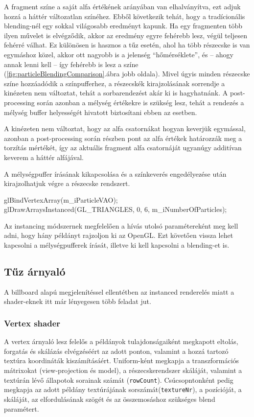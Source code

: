 A fragment színe a saját alfa értékének arányában van elhalványítva, ezt adjuk hozzá a háttér változatlan színéhez. Ebből következik tehát, hogy a tradícionális blending-nél egy sokkal világosabb eredményt kapunk. Ha egy fragmenten több ilyen művelet is elvégződik, akkor az eredmény egyre fehérebb lesz, végül teljesen fehérré válhat. Ez különösen is hasznos a tűz esetén, ahol ha több részecske is van egymáshoz közel, akkor ott nagyobb is a jelenség ``hőmérséklete'', és -- ahogy annak lenni kell -- így fehérebb is lesz a színe (\ref{fig:particleBlendingComparison}.ábra jobb oldala). Mivel úgyis minden részecske színe hozzáadódik a színpufferhez, a részecskék kirajzolásának sorrendje a kinézeten nem változtat, tehát a sorbarendezést akár ki is hagyhatnánk. A post-processing során azonban a mélység értékekre is szükség lesz, tehát a rendezés a mélység buffer helyességét hivatott biztosítani ebben az esetben.

A kinézeten nem változtat, hogy az alfa csatornákat hogyan keverjük egymással, azonban a post-processing során részben pont az alfa értékek határozzák meg a torzítás mértékét, így az aktuális fragment alfa csatornáját ugyanúgy additívan keverem a háttér alfájával.

A mélységpuffer írásának kikapcsolása és a színkeverés engedélyezése után kirajzolhatjuk végre a részecske rendszert.
\begin{cpp}
glBindVertexArray(m_iParticleVAO);
glDrawArraysInstanced(GL_TRIANGLES, 0, 6, m_iNumberOfParticles);
\end{cpp}
Az instancing módszernek megfelelően a hívás utolsó paramétereként meg kell adni, hogy hány példányt rajzoljon ki az OpenGL. Ezt követően vissza lehet kapcsolni a mélységpufferek írását, illetve ki kell kapcsolni a blending-et is.

\subsection{Tűz árnyaló}
A billboard alapú megjelenítéssel ellentétben az instanced renderelés miatt a shader-eknek itt már lényegesen több feladat jut. 

\subsubsection{Vertex shader}
A vertex árnyaló lesz felelős a példányok tulajdonságaiként megkapott eltolás, forgatás és skálázás elvégzéséért az adott ponton, valamint a hozzá tartozó textúra koordináták kiszámításáért. Uniform-ként megkapja a transzformációs mátrixokat (view-projection és model), a részecskerendszer skáláját, valamint a textúrán lévő állapotok sorainak számát (\texttt{rowCount}). Csúcsopntonként pedig megkapja az adott példány textúrájának sorszámát(\texttt{textureNr}), a pozícióját, a skáláját, az elfordulásának szögét és az összemosáshoz szükséges blend paramétert. 

